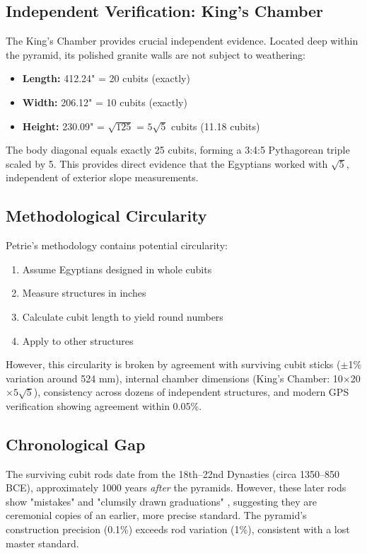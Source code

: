 \documentclass[11pt]{article}
\theoremstyle{definition}
\theoremstyle{remark}
\begin{document}
\subsection{Independent Verification: King's Chamber}

The King's Chamber provides crucial independent evidence. Located deep within the pyramid, its polished granite walls are not subject to weathering:

\begin{itemize}
\item \textbf{Length:} 412.24" = 20 cubits (exactly)
\item \textbf{Width:} 206.12" = 10 cubits (exactly)
\item \textbf{Height:} 230.09" = $\sqrt{125}$ = $5\sqrt{5}$ cubits (11.18 cubits)
\end{itemize}

The body diagonal equals exactly 25 cubits, forming a 3:4:5 Pythagorean triple scaled by 5. This provides direct evidence that the Egyptians worked with $\sqrt{5}$, independent of exterior slope measurements.

\subsection{Methodological Circularity}

Petrie's methodology contains potential circularity:
\begin{enumerate}
\item Assume Egyptians designed in whole cubits
\item Measure structures in inches
\item Calculate cubit length to yield round numbers
\item Apply to other structures
\end{enumerate}

However, this circularity is broken by agreement with surviving cubit sticks ($\pm$1\% variation around 524 mm), internal chamber dimensions (King's Chamber: 10$\times$20$\times$$5\sqrt{5}$), consistency across dozens of independent structures, and modern GPS verification \cite{dash2015} showing agreement within 0.05\%.

\subsection{Chronological Gap}

The surviving cubit rods date from the 18th--22nd Dynasties (circa 1350--850 BCE), approximately 1000 years \emph{after} the pyramids. However, these later rods show "mistakes" and "clumsily drawn graduations" \cite{monnier2016}, suggesting they are ceremonial copies of an earlier, more precise standard. The pyramid's construction precision (0.1\%) exceeds rod variation (1\%), consistent with a lost master standard.
\end{document}
